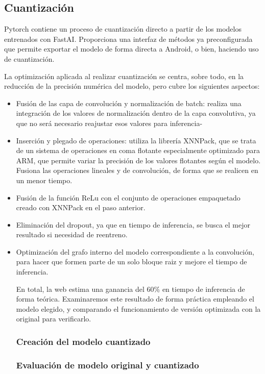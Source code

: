 \subsection{Cuantización}

Pytorch contiene un proceso de cuantización directo a partir de los modelos entrenados con FastAI. Proporciona una interfaz de métodos ya preconfigurada que permite exportar el modelo de forma directa a Android, o bien, haciendo uso de cuantización.

La optimización aplicada al realizar cuantización se centra, sobre todo, en la reducción de la precisión numérica del modelo, pero cubre los siguientes aspectos:

\begin{itemize}
	\item Fusión de las capa de convolución y normalización de batch: realiza una integración de los valores de normalización dentro de la capa convolutiva, ya que no será necesario reajustar esos valores para inferencia-
	\item Inserción y plegado de operaciones: utiliza la librería XNNPack, que se trata de un sistema de operaciones en coma flotante especialmente optimizado para ARM, que permite variar la precisión de los valores flotantes según el modelo. Fusiona las operaciones lineales y de convolución, de forma que se realicen en un menor tiempo.
	\item Fusión de la función ReLu con el conjunto de operaciones empaquetado creado con XNNPack en el paso anterior.
	\item Eliminación del dropout, ya que en tiempo de inferencia, se busca el mejor resultado si necesidad de reentreno.
	\item Optimización del grafo interno del modelo correspondiente a la convolución, para hacer que formen parte de un solo bloque raiz y mejore el tiempo de inferencia.
	
En total, la web estima una ganancia del 60\% en tiempo de inferencia de forma teórica. Examinaremos este resultado de forma práctica empleando el modelo elegido, y comparando el funcionamiento de versión optimizada con la original para verificarlo.

\subsubsection{Creación del modelo cuantizado}
\subsubsection{Evaluación de modelo original y cuantizado}
	
\end{itemize}


